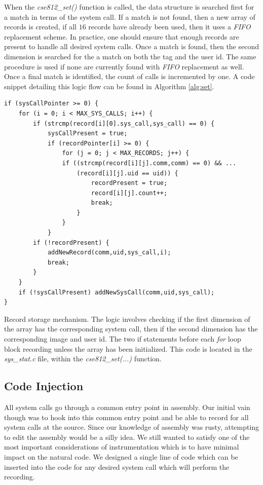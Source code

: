 \documentclass[conference]{IEEEtran}
\begin{document}
When the \textit{cse812\_set()} function is called, the data structure is searched first for a match in terms of the system call.
If a match is not found, then a new array of records is created, if all $16$ records have already been used, then it uses a \textit{FIFO} replacement scheme.
In practice, one should ensure that enough records are present to handle all desired system calls.
Once a match is found, then the second dimension is searched for the a match on both the tag and the user id.
The same procedure is used if none are currently found with \textit{FIFO} replacement as well.
Once a final match is identified, the count of calls is incremented by one.  A code snippet detailing this logic flow can be found in Algorithm \ref{alg:set}.

\begin{algorithm*}[t!]
\begin{lstlisting}
if (sysCallPointer >= 0) {
	for (i = 0; i < MAX_SYS_CALLS; i++) {
		if (strcmp(record[i][0].sys_call,sys_call) == 0) {
			sysCallPresent = true;
			if (recordPointer[i] >= 0) {
				for (j = 0; j < MAX_RECORDS; j++) {
				if ((strcmp(record[i][j].comm,comm) == 0) && ...
					(record[i][j].uid == uid)) {
						recordPresent = true;
						record[i][j].count++;
						break;
					}
				}
			}
		if (!recordPresent) {
    		addNewRecord(comm,uid,sys_call,i);
    		break;
		}
	}
	if (!sysCallPresent) addNewSysCall(comm,uid,sys_call);
}
\end{lstlisting}
\caption{Record storage mechanism.
\label{alg:set}
The logic involves checking if the first dimension of the array has the corresponding system call, then if the second dimension has the corresponding image and user id.
The two if statements before each \textit{for} loop block recording unless the array has been initialized.
This code is located in the \textit{sys\_stat.c} file, within the \textit{cse812\_set(...)} function.
}
\end{algorithm*}

\subsection{Code Injection}
All system calls go through a common entry point in assembly.
Our initial vain though was to hook into this common entry point and be able to record for all system calls at the source.
Since our knowledge of assembly was rusty, attempting to edit the assembly would be a silly idea.
We still wanted to satisfy one of the most important considerations of instrumentation which is to have minimal impact on the natural code.
We designed a single line of code which can be inserted into the code for any desired system call which will perform the recording.
\end{document}
